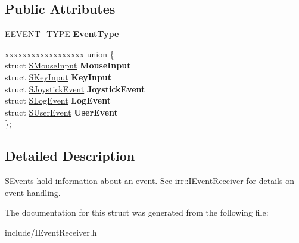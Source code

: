 \subsection*{Public Attributes}
\begin{DoxyCompactItemize}
\item 
\hyperlink{namespaceirr_ac9eed96e06e85ce3c86fcbbbe9e48a0c}{E\+E\+V\+E\+N\+T\+\_\+\+T\+Y\+PE} {\bfseries Event\+Type}\hypertarget{structirr_1_1SEvent_a8b48c016d5c20a9b0967b1ce0fb3ef15}{}\label{structirr_1_1SEvent_a8b48c016d5c20a9b0967b1ce0fb3ef15}

\item 
\begin{tabbing}
xx\=xx\=xx\=xx\=xx\=xx\=xx\=xx\=xx\=\kill
union \{\\
\>struct \hyperlink{structirr_1_1SEvent_1_1SMouseInput}{SMouseInput} {\bfseries MouseInput}\\
\>struct \hyperlink{structirr_1_1SEvent_1_1SKeyInput}{SKeyInput} {\bfseries KeyInput}\\
\>struct \hyperlink{structirr_1_1SEvent_1_1SJoystickEvent}{SJoystickEvent} {\bfseries JoystickEvent}\\
\>struct \hyperlink{structirr_1_1SEvent_1_1SLogEvent}{SLogEvent} {\bfseries LogEvent}\\
\>struct \hyperlink{structirr_1_1SEvent_1_1SUserEvent}{SUserEvent} {\bfseries UserEvent}\\
\}; \hypertarget{structirr_1_1SEvent_a4bfb702606eeb903e4f3d266a883afc3}{}\label{structirr_1_1SEvent_a4bfb702606eeb903e4f3d266a883afc3}
\\

\end{tabbing}\end{DoxyCompactItemize}


\subsection{Detailed Description}
S\+Events hold information about an event. See \hyperlink{classirr_1_1IEventReceiver}{irr\+::\+I\+Event\+Receiver} for details on event handling. 

The documentation for this struct was generated from the following file\+:\begin{DoxyCompactItemize}
\item 
include/I\+Event\+Receiver.\+h\end{DoxyCompactItemize}
